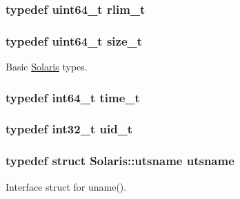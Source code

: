 \label{classSolaris_a2cb84cf5f02a29b7e8f237ff151a9225}
\hypertarget{classSolaris_a38a5c8082e90a1fee7994faa419a2718}{
\subsubsection[{rlim\_\-t}]{\setlength{\rightskip}{0pt plus 5cm}typedef uint64\_\-t {\bf rlim\_\-t}}}
\label{classSolaris_a38a5c8082e90a1fee7994faa419a2718}
\hypertarget{classSolaris_a186ea1339bffb378854987065835afe3}{
\subsubsection[{size\_\-t}]{\setlength{\rightskip}{0pt plus 5cm}typedef uint64\_\-t {\bf size\_\-t}}}
\label{classSolaris_a186ea1339bffb378854987065835afe3}


Basic \hyperlink{classSolaris}{Solaris} types. \hypertarget{classSolaris_a7f5991675a84025dc7c24754a9b257c0}{
\subsubsection[{time\_\-t}]{\setlength{\rightskip}{0pt plus 5cm}typedef int64\_\-t {\bf time\_\-t}}}
\label{classSolaris_a7f5991675a84025dc7c24754a9b257c0}
\hypertarget{classSolaris_a329afc5720e0f587c9082a0c7d8bc5ef}{
\subsubsection[{uid\_\-t}]{\setlength{\rightskip}{0pt plus 5cm}typedef int32\_\-t {\bf uid\_\-t}}}
\label{classSolaris_a329afc5720e0f587c9082a0c7d8bc5ef}
\hypertarget{classSolaris_a75007aec58bc064c3e3a0cadc7231f75}{
\subsubsection[{utsname}]{\setlength{\rightskip}{0pt plus 5cm}typedef struct {\bf Solaris::utsname}  {\bf utsname}}}
\label{classSolaris_a75007aec58bc064c3e3a0cadc7231f75}


Interface struct for uname(). 

